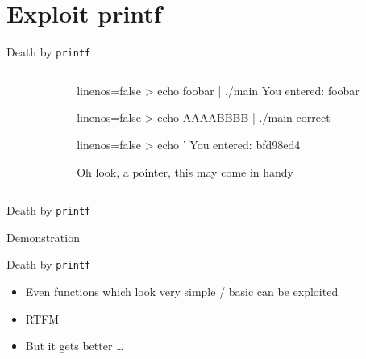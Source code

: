 \documentclass[beamer]{uibk}
\begin{document}
\section{Exploit printf}

\begin{frame}[fragile]{Death by \texttt{printf}}
    \begin{columns}
        \begin{column}{0.5\textwidth}
        \end{column}
        \begin{column}{0.5\textwidth}
            \pause
            \begin{code*}{linenos=false}
                > echo foobar | ./main
                You entered:
                foobar
            \end{code*}
            \bigskip\pause
            \begin{code*}{linenos=false}
                > echo AAAABBBB | ./main
                correct
            \end{code*}
            \bigskip\pause
            \begin{code*}{linenos=false}
                > echo '%
                You entered:
                bfd98ed4
            \end{code*}
            \medskip
            Oh look, a pointer, this may come in handy
        \end{column}
    \end{columns}
\end{frame}

\begin{frame}{Death by \texttt{printf}}
    \begin{center}
        \huge Demonstration
    \end{center}
\end{frame}

\begin{frame}{Death by \texttt{printf}}
    \begin{itemize}
        \item Even functions which look very simple / basic can be exploited
        \bigskip
        \item RTFM
        \bigskip
        \pause
        \item But it gets better \dots
    \end{itemize}
\end{frame}
\end{document}
